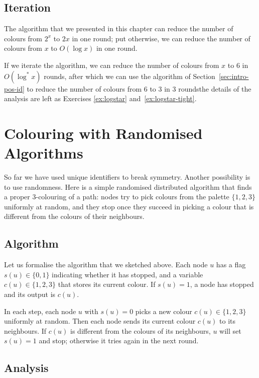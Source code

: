 \subsection{Iteration}

The algorithm that we presented in this chapter can reduce the number of colours from $2^x$ to $2x$ in one round; put otherwise, we can reduce the number of colours from $x$ to $O(\log x)$ in one round.

If we iterate the algorithm, we can reduce the number of colours from $x$ to $6$ in $O(\log^* x)$ rounds, after which we can use the algorithm of Section~\ref{sec:intro-pos-id} to reduce the number of colours from $6$ to $3$ in $3$ rounds\mydash the details of the analysis are left as Exercises \ref{ex:logstar} and~\ref{ex:logstar-tight}.


\section{Colouring with Randomised Algorithms}\label{sec:intro-pos-random}

So far we have used unique identifiers to break symmetry. Another possibility is to use randomness. Here is a simple randomised distributed algorithm that finds a proper $3$-colouring of a path: nodes try to pick colours from the palette $\{1,2,3\}$ uniformly at random, and they stop once they succeed in picking a colour that is different from the colours of their neighbours.


\subsection{Algorithm}

Let us formalise the algorithm that we sketched above. Each node $u$ has a flag $s(u) \in \{0,1\}$ indicating whether it has stopped, and a variable $c(u) \in \{1,2,3\}$ that stores its current colour. If $s(u) = 1$, a node has stopped and its output is $c(u)$.

In each step, each node $u$ with $s(u) = 0$ picks a new colour $c(u) \in \{1,2,3\}$ uniformly at random. Then each node sends its current colour $c(u)$ to its neighbours. If $c(u)$ is different from the colours of its neighbours, $u$ will set $s(u) = 1$ and stop; otherwise it tries again in the next round.


\subsection{Analysis}

